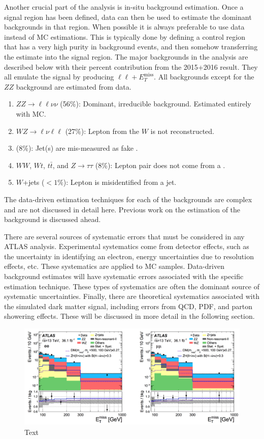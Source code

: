 Another crucial part of the analysis is in-situ background estimation. Once a signal region has been defined, data can then be used to estimate the dominant backgrounds in that region. When possible it is always preferable to use data instead of MC estimations. This is typically done by defining a control region that has a very high purity in background events, and then somehow transferring the estimate into the signal region. The major backgrounds in the analysis are described below with their percent contribution from the 2015+2016 result. They all emulate the signal by producing $\ell\ell+E_{T}^\text{miss}$. All backgrounds except for the $ZZ$ background are estimated from data.
\begin{enumerate}
	\item	 $ZZ \rightarrow \ell \ell \nu \nu$ (56\%): Dominant, irreducible background. Estimated entirely with MC. 
	\item	 $WZ \rightarrow \ell \nu \ell \ell$ (27\%): Lepton from the $W$ is not reconstructed. 
	\item \Zjets (8\%): Jet(s) are mis-measured as fake \etmiss. 
	\item $WW$, $Wt$, $t\bar{t}$, and $Z\rightarrow \tau \tau$ (8\%): Lepton pair does not come from a \Z.
	\item $W$+jets ($<1\%$): Lepton is misidentified from a jet.
\end{enumerate}

\noindent The data-driven estimation techniques for each of the backgrounds are complex and are not discussed in detail here. Previous work on the estimation of the \Zjets background is discussed ahead.

There are several sources of systematic errors that must be considered in any ATLAS analysis. Experimental systematics come from detector effects, such as the uncertainty in identifying an electron, energy uncertainties due to resolution effects, etc. These systematics are applied to MC samples. Data-driven background estimates will have systematic errors associated with the specific estimation technique. These types of systematics are often the dominant source of systematic uncertainties. Finally, there are theoretical systematics associated with the simulated dark matter signal, including errors from QCD, PDF, and parton showering effects. These will be discussed in more detail in the following section.

\begin{figure}[htb]
\centering
\includegraphics[width=1\textwidth]{Figures/srEPS.png}
\caption{Text}
\label{fig:srEPS}
\end{figure}

